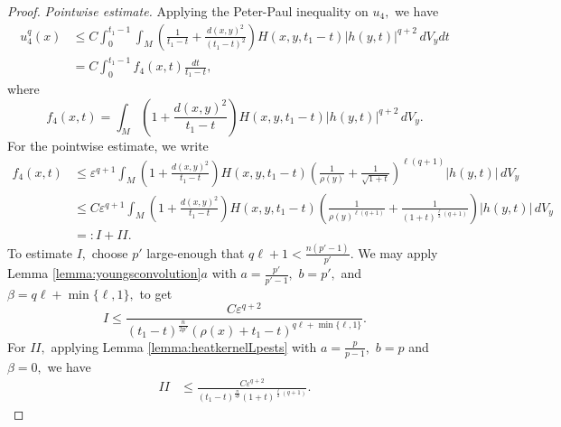 \documentclass[12pt]{amsart}
\renewcommand{\1}{{\mathbf 1}}
\newcommand{\eps}{{\varepsilon}}
\theoremstyle{others}
\numberwithin{equation}{section}
\begin{document}
\begin{proof}
       \vspace{2mm}
       
      \emph{Pointwise estimate.} Applying the Peter-Paul inequality on $u_4,$ we have
       \begin{equation}\label{u4firstpointwiseexpression}
       \begin{split}
           u^q_4(x) & \leq C \int_0^{t_1 - 1} \!\!\!\! \int_M \left( \frac{1}{t_1 - t} + \frac{d(x,y)^2  }{(t_1 - t)^{2} } \right) H(x,y,t_1 - t) |h(y,t)|^{q + 2}  \, dV_y dt \\
           & = C \int_0^{t_1 - 1} \!\!\!\! f_4(x,t) \frac{dt}{t_1 - t},
           \end{split}
       \end{equation}
       where
       $$f_4(x,t) = \int_M \left( 1 + \frac{d(x,y)^2  }{t_1 - t } \right) H(x,y,t_1 - t) |h(y,t)|^{q + 2}  \, dV_y.$$
       For the pointwise estimate, we write
       \begin{equation*}
       \begin{split}
           f_4(x,t) & \leq \eps^{q + 1} \int_M \left( 1 + \frac{d(x,y)^2  }{t_1 - t } \right) H(x,y,t_1 - t) \left( \frac{1}{\rho(y)} + \frac{1}{\sqrt{1 + t}} \right)^{\ell(q + 1)} |h(y,t)| \, dV_y \\
           & \leq C \eps^{q + 1} \int_M \left( 1 + \frac{d(x,y)^2  }{t_1 - t } \right) H(x,y,t_1 - t) \left( \frac{1}{\rho(y)^{\ell(q + 1)}} + \frac{1}{(1 + t)^{\frac{\ell}{2} \left( q + 1 \right)}} \right) |h(y,t)| \, dV_y \\
           & =: I + II.
           \end{split}
           \end{equation*}
    To estimate $I,$ choose $p'$ large-enough that $q\ell + 1 < \frac{n(p' - 1)}{p'}.$ We may apply Lemma \ref{lemma:youngsconvolution}$a$ with $a = \frac{p'}{p' - 1},$ $b = p',$ and $\beta = q\ell + \min\{\ell, 1\},$ to get
    \begin{equation*}
        I \leq \frac{C \eps^{q + 2} }{(t_1 - t)^{\frac{n}{2p'}}(\rho(x) + t_1 - t)^{q \ell + \min \{ \ell, 1 \} } }.
        \end{equation*}
    For $II,$ applying Lemma \ref{lemma:heatkernelLpests} with $a = \frac{p}{p - 1},$ $b = p$ and $\beta = 0,$ we have
    \begin{equation*}
       \begin{split}
           II & \leq \frac{C \eps^{q + 2} }{(t_1 - t)^{\frac{n}{2p}} (1 + t)^{\frac{\ell}{2} \left( q + 1 \right)}}.
           \end{split}

\end{equation*}
\end{proof}
\end{document}
